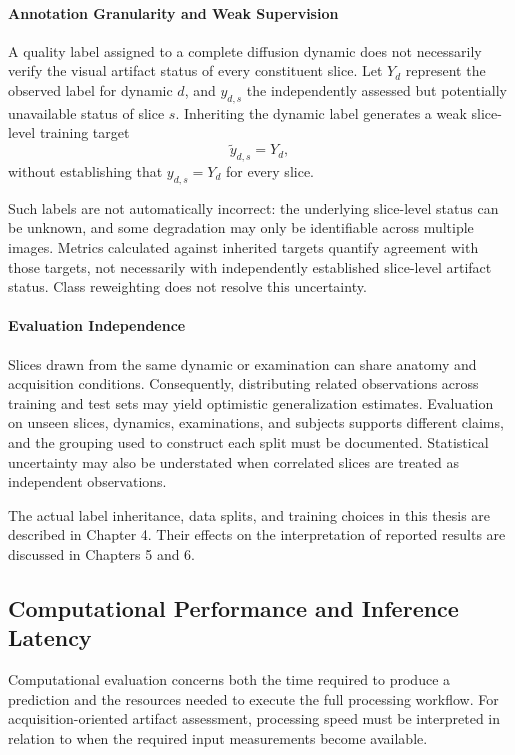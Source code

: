 \paragraph{Annotation Granularity and Weak Supervision}
A quality label assigned to a complete diffusion dynamic does not necessarily verify the visual artifact status of every constituent slice. Let $Y_d$ represent the observed label for dynamic $d$, and $y_{d,s}$ the independently assessed but potentially unavailable status of slice $s$. Inheriting the dynamic label generates a weak slice-level training target
\begin{equation}
\widetilde{y}_{d,s}=Y_d,
\end{equation}
without establishing that $y_{d,s}=Y_d$ for every slice.

Such labels are not automatically incorrect: the underlying slice-level status can be unknown, and some degradation may only be identifiable across multiple images. Metrics calculated against inherited targets quantify agreement with those targets, not necessarily with independently established slice-level artifact status. Class reweighting does not resolve this uncertainty.

\paragraph{Evaluation Independence}
Slices drawn from the same dynamic or examination can share anatomy and acquisition conditions. Consequently, distributing related observations across training and test sets may yield optimistic generalization estimates. Evaluation on unseen slices, dynamics, examinations, and subjects supports different claims, and the grouping used to construct each split must be documented. Statistical uncertainty may also be understated when correlated slices are treated as independent observations.

The actual label inheritance, data splits, and training choices in this thesis are described in Chapter 4. Their effects on the interpretation of reported results are discussed in Chapters 5 and 6.

\subsection{Computational Performance and Inference Latency}

Computational evaluation concerns both the time required to produce a prediction and the resources needed to execute the full processing workflow. For acquisition-oriented artifact assessment, processing speed must be interpreted in relation to when the required input measurements become available.


